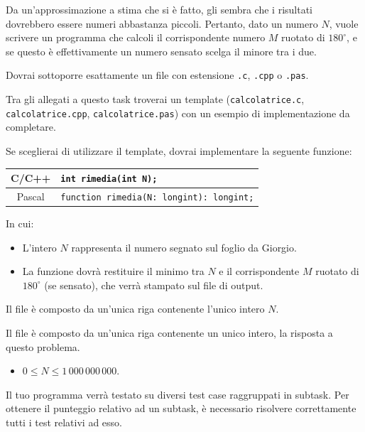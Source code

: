 	Da un'approssimazione a stima che si è fatto, gli sembra che i risultati dovrebbero essere numeri abbastanza piccoli. Pertanto, dato un numero $N$, vuole scrivere un programma che calcoli il corrispondente numero $M$ ruotato di $180^\circ$, e se questo è effettivamente un numero sensato scelga il minore tra i due.

\Implementation
Dovrai sottoporre esattamente un file con estensione \texttt{.c}, \texttt{.cpp} o \texttt{.pas}.

\begin{warning}
Tra gli allegati a questo task troverai un template (\texttt{calcolatrice.c}, \texttt{calcolatrice.cpp}, \texttt{calcolatrice.pas}) con un esempio di implementazione da completare.
\end{warning}

Se sceglierai di utilizzare il template, dovrai implementare la seguente funzione:
\begin{center}\begin{tabularx}{\textwidth}{|c|X|}
\hline
C/C++  & \verb|int rimedia(int N);|\\
\hline
Pascal & \verb|function rimedia(N: longint): longint;|\\
\hline
\end{tabularx}\end{center}
In cui:
\begin{itemize}[nolistsep]
  \item L'intero $N$ rappresenta il numero segnato sul foglio da Giorgio.
  \item La funzione dovrà restituire il minimo tra $N$ e il corrispondente $M$ ruotato di $180^\circ$ (se sensato), che verrà stampato sul file di output.
\end{itemize}

\InputFile
Il file  è composto da un'unica riga contenente l'unico intero $N$.

\OutputFile
Il file \outputfile{} è composto da un'unica riga contenente un unico intero, la risposta a questo problema.

\Constraints
\begin{itemize}[nolistsep, itemsep=2mm]
	\item $0 \le N \le 1\,000\,000\,000$.
\end{itemize}

\Scoring
Il tuo programma verrà testato su diversi test case raggruppati in subtask.
Per ottenere il punteggio relativo ad un subtask, è necessario risolvere
correttamente tutti i test relativi ad esso.

